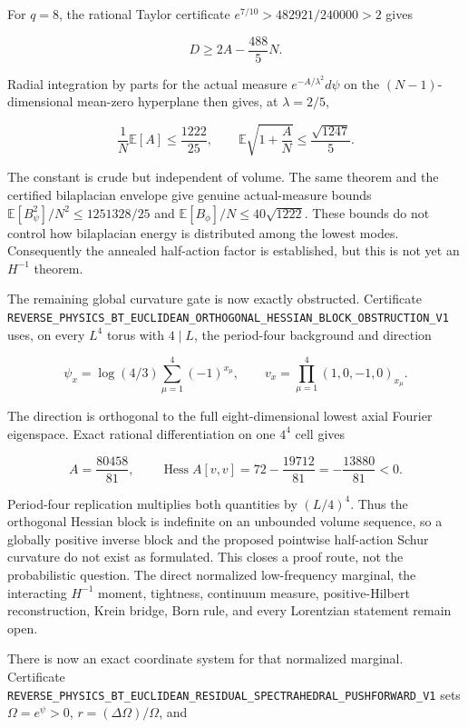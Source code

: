 \documentclass[11pt]{article}
\theoremstyle{definition}
\theoremstyle{remark}
\newcommand{\cert}[1]{\nolinkurl{#1}}
\begin{document}
For \(q=8\), the rational Taylor certificate
\(e^{7/10}>482921/240000>2\) gives

\[
                    D\geq2A-\frac{488}{5}N.
\]

Radial integration by parts for the actual measure
\(e^{-A/\lambda^2}d\psi\) on the \((N-1)\)-dimensional mean-zero hyperplane
then gives, at \(\lambda=2/5\),

\[
 \frac1N\mathbb E[A]\leq\frac{1222}{25},
 \qquad
 \mathbb E\sqrt{1+\frac AN}\leq\frac{\sqrt{1247}}5.
\]

The constant is crude but independent of volume.  The same theorem and the
certified bilaplacian envelope give genuine actual-measure bounds
\(\mathbb E[B_\psi^2]/N^2\leq1251328/25\) and
\(\mathbb E[B_\phi]/N\leq40\sqrt{1222}\).  These bounds do not control how
bilaplacian energy is distributed among the lowest modes.  Consequently the
annealed half-action factor is established, but this is not yet an
\(H^{-1}\) theorem.

The remaining global curvature gate is now exactly obstructed.  Certificate
\cert{REVERSE_PHYSICS_BT_EUCLIDEAN_ORTHOGONAL_HESSIAN_BLOCK_OBSTRUCTION_V1}
uses, on every \(L^4\) torus with \(4\mid L\), the period-four background and
direction

\[
 \psi_x=\log(4/3)\sum_{\mu=1}^4(-1)^{x_\mu},\qquad
 v_x=\prod_{\mu=1}^4(1,0,-1,0)_{x_\mu}.
\]

The direction is orthogonal to the full eight-dimensional lowest axial
Fourier eigenspace.  Exact rational differentiation on one \(4^4\) cell gives

\[
 A=\frac{80458}{81},\qquad
 \operatorname{Hess}A[v,v]=72-\frac{19712}{81}
 =-\frac{13880}{81}<0.
\]

Period-four replication multiplies both quantities by \((L/4)^4\).  Thus the
orthogonal Hessian block is indefinite on an unbounded volume sequence, so a
globally positive inverse block and the proposed pointwise half-action Schur
curvature do not exist as formulated.  This closes a proof route, not the
probabilistic question.  The direct normalized low-frequency marginal, the
interacting \(H^{-1}\) moment, tightness, continuum measure, positive-Hilbert
reconstruction, Krein bridge, Born rule, and every Lorentzian statement remain
open.

There is now an exact coordinate system for that normalized marginal.
Certificate
\cert{REVERSE_PHYSICS_BT_EUCLIDEAN_RESIDUAL_SPECTRAHEDRAL_PUSHFORWARD_V1}
sets \(\Omega=e^\psi>0\), \(r=(\Delta\Omega)/\Omega\), and
\end{document}
